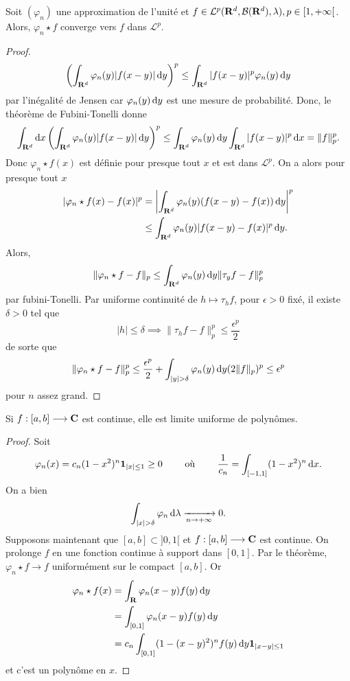 \begin{thm}
    Soit $(\varphi_n)$ une approximation de l'unité et  $f \in  \mathcal  L^p(\mathbf R^d, \mathcal  B(\mathbf R^d), \lambda), p \in  [1, +\infty[$. Alors, $\varphi_n\star f$ converge vers $f$ dans  $\mathcal  L^p$.
\end{thm}

\begin{proof}
    \[\left(\int_{\mathbf R^d} \varphi_n(y)|f(x-y)|\mathop{}\!\mathrm d y\right)^p \leq \int_{\mathbf R^d}|f(x-y)|^p\varphi_n(y)\mathop{}\!\mathrm d y\] par l'inégalité de Jensen car $ \varphi_n(y)\mathop{}\!\mathrm d y $ est une mesure de probabilité. Donc, le théorème de Fubini-Tonelli donne \[
    \int_{\mathbf R^d} \mathop{}\!\mathrm d x \left(\int_{\mathbf R^d}\varphi_n(y)|f(x-y)|\mathop{}\!\mathrm d y\right)^p\leq \int_{\mathbf R^d}\varphi_n(y)\mathop{}\!\mathrm d y\int_{\mathbf R^d}|f(x-y)|^p\mathop{}\!\mathrm d x=\|f\|_p^p.
\]
Donc $\varphi_n\star f(x)$ est définie pour presque tout  $x$ et est dans  $\mathcal  L^p$. On a alors pour presque tout $x$
 \begin{align*}
|\varphi_n\star f(x)-f(x)|^p &= \left| \int_{\mathbf R^d}\varphi_n(y)(f(x-y)-f(x))\mathop{}\!\mathrm d y \right|^p\\ &\leq \int_{\mathbf R^d} \varphi_n(y)|f(x-y)-f(x)|^p\mathop{}\!\mathrm d y.
\end{align*}
Alors, \[\|\varphi_n\star f-f\|_p\leq \int_{\mathbf R^d}\varphi_n(y)\mathop{}\!\mathrm d y\|\tau_yf-f\|_p^p\] par fubini-Tonelli. Par uniforme continuité de $h\mapsto \tau_hf$, pour $\epsilon>0$ fixé, il existe $\delta>0$ tel que  \[
|h|\leq \delta \implies \|\tau_hf-f\|_p^p\leq \frac{\epsilon^p}2
\] 
de sorte que \[\|\varphi_n\star f-f\|_p^p\leq \frac{\epsilon^p}2+\int_{|y|>\delta}\varphi_n(y)\diff y (2\|f\|_p)^p\leq \epsilon^p\] pour $n$ assez grand.
\end{proof}

\begin{cor}
    Si $f:[a, b]\longrightarrow \mathbf C$ est continue, elle est limite uniforme de polynômes.
\end{cor}


\begin{proof}
Soit \[
    \varphi_n(x)=c_n(1-x^2 )^n\bm{1}_{|x|\leq 1}\geq 0 \qquad \text{ où } \qquad \frac1{c_n}=\int_{[-1,1]}(1-x^2 )^n\mathop{}\!\mathrm d x.
\] 
On a bien \[
\int_{|x|>\delta}\varphi_n\diff\lambda \xrightarrow[n\to+\infty]{}0.
\]
Supposons maintenant que $[a, b]\subset ]0,1[$ et  $f:[a, b] \longrightarrow  \mathbf C$ est continue. On prolonge $f$ en une fonction continue à support dans  $[0,1]$. Par le théorème,  $\varphi_n\star f \longrightarrow f$ uniformément sur le compact $[a, b]$. Or
 \begin{align*}
     \varphi_n\star f(x)&=\int_{\mathbf R} \varphi_n(x-y)f(y)\mathop{}\!\mathrm d y\\ &=\int_{[0,1]}\varphi_n(x-y)f(y)\mathop{}\!\mathrm d y\\&= c_n\int_{[0,1]}(1-(x-y)^2 )^n f(y)\mathop{}\!\mathrm d y \bm{1}_{|x-y|\leq 1}
\end{align*}
et c'est un polynôme en $x$.
\end{proof}

